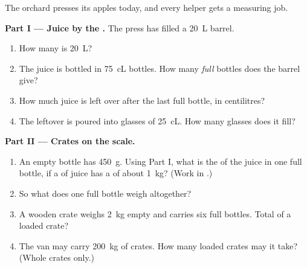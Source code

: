 \begin{problem}\label{pb:g6:mass-and-volume:1}
The orchard presses its apples today, and every helper gets a
measuring job.

\medskip\noindent\textbf{Part I --- Juice by the .}
The press has filled a \qty{20}{L} barrel.
\begin{enumerate}
  \item How many  is \qty{20}{L}?
  \item The juice is bottled in \qty{75}{cL} bottles. How many
        \emph{full} bottles does the barrel give?
  \item How much juice is left over after the last full bottle, in
        centilitres?
  \item The leftover is poured into glasses of \qty{25}{cL}. How
        many glasses does it fill?
\end{enumerate}

\medskip\noindent\textbf{Part II --- Crates on the scale.}
\begin{enumerate}[resume]
  \item An empty bottle has  \qty{450}{g}. Using Part I, what
        is the  of the juice in one full bottle, if a  of
        juice has a  of about \qty{1}{kg}? (Work in .)
  \item So what does one full bottle weigh altogether?
  \item A wooden crate weighs \qty{2}{kg} empty and carries six
        full bottles. Total  of a loaded crate?
  \item The van may carry \qty{200}{kg} of crates. How many loaded
        crates may it take? (Whole crates only.)
\end{enumerate}


\end{problem}
